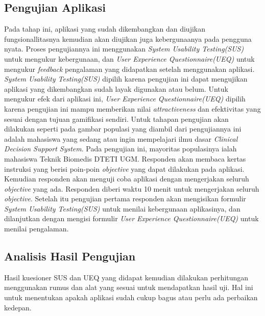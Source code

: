 \subsection{Pengujian Aplikasi}
Pada tahap ini, aplikasi yang sudah dikembangkan dan diujikan fungsionallitasnya kemudian akan diujikan juga kebergunaanya pada pengguna nyata.
Proses pengujiannya ini menggunakan \textit{System Usability Testing(SUS)} untuk mengukur kebergunaan, dan \textit{User Experience Questionnaire(UEQ)} untuk mengukur \textit{feedback} pengalaman yang didapatkan setelah menggunakan aplikasi.
\textit{System Usability Testing(SUS)} dipilih karena pengujian ini dapat mengujikan aplikasi yang dikembangkan sudah layak digunakan atau belum.
Untuk mengukur efek dari aplikasi ini, \textit{User Experience Questionnaire(UEQ)} dipilih karena pengujian ini mampu memberikan nilai \textit{attractiveness} dan efektivitas yang sesuai dengan tujuan gamifikasi sendiri. 
Untuk tahapan pengujian akan dilakukan seperti pada gambar 
populasi yang diambil dari pengujiannya ini adalah mahasiswa yang sedang atau ingin mempelajari ilmu dasar \textit{Clinical Decision Support System}.
Pada pengujian ini, mayoritas populasinya ialah mahasiswa Teknik Biomedis DTETI UGM.
Responden akan membaca kertas instruksi yang berisi poin-poin \textit{objective} yang dapat dilakukan pada aplikasi.
Kemudian responden akan menguji coba aplikasi dengan mengerjakan seluruh \textit{objective} yang ada. Responden diberi waktu 10 menit untuk mengerjakan seluruh \textit{objective}.
Setelah itu pengujian pertama responden akan mengisikan formulir \textit{System Usability Testing(SUS)} untuk menilai kebergunaan aplikasinya, dan dilanjutkan dengan mengisi formulir \textit{User Experience Questionnaire(UEQ)} untuk menilai pengalaman.
\subsection{Analisis Hasil Pengujian}
Hasil kuesioner SUS dan UEQ yang didapat kemudian dilakukan 
perhitungan menggunakan rumus dan alat yang sesuai untuk mendapatkan hasil 
uji. Hal ini untuk menentukan apakah aplikasi sudah cukup bagus atau perlu ada 
perbaikan kedepan. 
